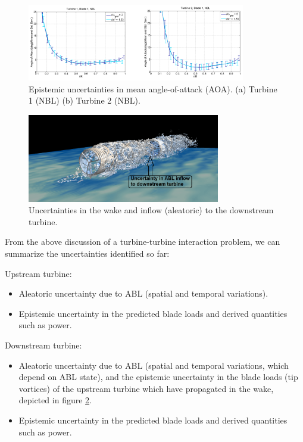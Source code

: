 \documentclass[]{aiaa-tc}%
\begin{document}
\begin{figure}
\centering
 \includegraphics[width=0.85\textwidth]{ALM_discrepancy.png}
 \caption{Epistemic uncertainties in mean angle-of-attack (AOA). (a) Turbine 1 (NBL)    (b) Turbine 2 (NBL).}
 \label{f:ALM_discrepancy}
\end{figure}

\begin{figure}
\centering
 \includegraphics[width=0.75\textwidth]{UQ3.png}
 \caption{Uncertainties in the wake and inflow (aleatoric) to the downstream turbine.}
 \label{f:UQ3}
\end{figure}

From the above discussion of a turbine-turbine interaction problem, we can summarize the uncertainties identified so far:

Upstream turbine: 
\begin{itemize}
  \item Aleatoric uncertainty due to ABL (spatial and temporal variations).
  \item Epistemic uncertainty in the predicted blade loads and derived quantities such as power.
\end{itemize}

Downstream turbine: 
\begin{itemize}
  \item Aleatoric uncertainty due to ABL (spatial and temporal variations, which depend on ABL state), and the epistemic uncertainty in the blade loads (tip vortices) of the upstream turbine which have propagated in the wake, depicted in figure \ref{f:UQ3}.
  \item Epistemic uncertainty in the predicted blade loads and derived quantities such as power.
\end{itemize}
\end{document}
